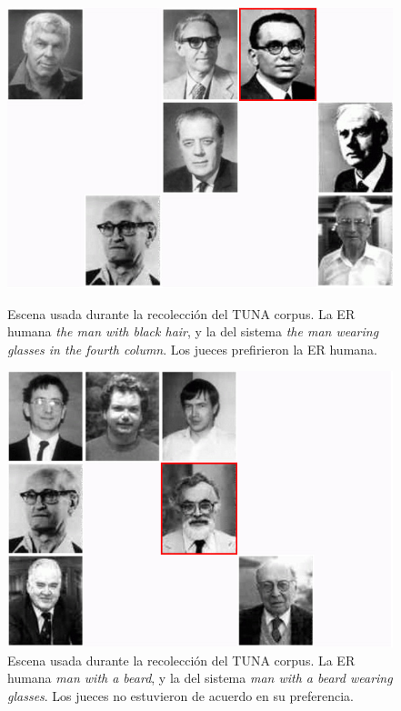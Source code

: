 \begin{table}[H]
\begin{figure}[h]
\begin{minipage}{0.48\linewidth}
\centering
\includegraphics[width=\textwidth]{images/s59t26.jpg}
\caption{Escena usada durante la recolecci\'on del TUNA corpus. La ER humana \emph{the man with black hair}, y la del sistema \emph{the man wearing glasses in the fourth column}. Los jueces prefirieron la ER humana.}
\label{s28t25}
\end{minipage}
\hspace*{.04cm}
\begin{minipage}{0.48\linewidth}
\centering
\includegraphics[width=\textwidth]{images/s315t21.jpg}
\vspace*{-.3cm}
\caption{Escena usada durante la recolecci\'on del TUNA corpus. La ER humana \emph{man with a beard},  y la del sistema \emph{man with a beard wearing glasses}. Los jueces no estuvieron de acuerdo en su preferencia.}
\label{s307t21}
\end{minipage}
\end{figure}


\end{table}
